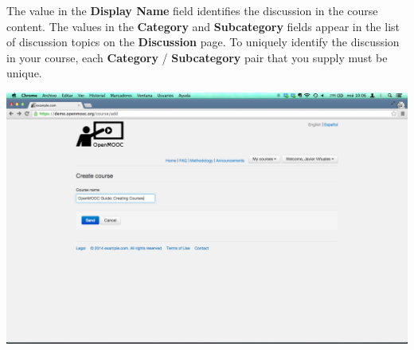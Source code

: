\documentclass[letterpaper,10pt,english]{sphinxmanual}
\begin{document}
\begin{enumerate}
The value in the \textbf{Display Name} field identifies the discussion in the
course content. The values in the \textbf{Category} and \textbf{Subcategory} fields
appear in the list of discussion topics on the \textbf{Discussion} page. To
uniquely identify the discussion in your course, each \textbf{Category} /
\textbf{Subcategory} pair that you supply must be unique.

\includegraphics{3_create_course-3.png}

\end{enumerate}



\renewcommand{\indexname}{Index}
\printindex
\end{document}
